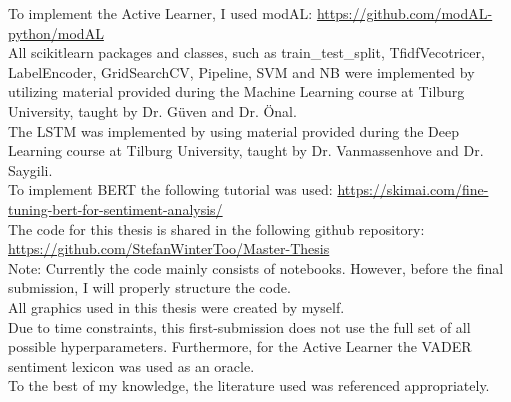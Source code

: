 \documentclass[11pt, a4paper]{article}
\begin{document}
\noindent To implement the Active Learner, I used modAL: \url{https://github.com/modAL-python/modAL}\\

\noindent All scikit\-learn packages and classes, such as train\_test\_split, TfidfVecotricer, LabelEncoder, GridSearchCV, 
Pipeline, SVM and NB were implemented by utilizing material provided during the Machine Learning course at Tilburg University, taught by Dr. Güven and Dr. Önal.\\

\noindent The LSTM was implemented by using material provided during the Deep Learning course at Tilburg University, taught by Dr. Vanmassenhove and Dr. Saygili.\\

\noindent To implement BERT the following tutorial was used: \url{https://skimai.com/fine-tuning-bert-for-sentiment-analysis/}\\


\noindent The code for this thesis is shared in the following github repository: \url{https://github.com/StefanWinterToo/Master-Thesis}\\
Note: Currently the code mainly consists of notebooks. However, before the final submission, I will properly structure the code.\\

\noindent All graphics used in this thesis were created by myself.\\

\noindent Due to time constraints, this first-submission does not use the full set of all possible hyperparameters. 
Furthermore, for the Active Learner the VADER sentiment lexicon was used as an oracle.\\

\noindent To the best of my knowledge, the literature used was referenced appropriately.
\end{document}
